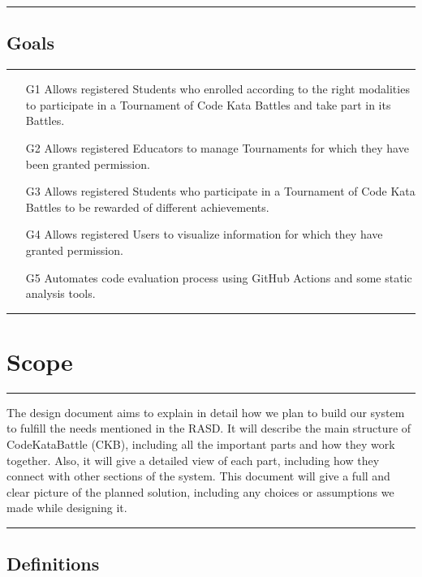 \documentclass{Configuration_Files/Template}
\begin{document}
{\color{bluepoli}\rule{\linewidth}{0.1pt}}

\subsection{Goals}

{\color{bluepoli}\rule{\linewidth}{0.1pt}}

\begin{enumerate}
    \item[\textcolor{bluepoli}{G1}] Allows registered Students who enrolled according to the right modalities to participate in a Tournament of Code Kata Battles and take part in its Battles.
    \item[\textcolor{bluepoli}{G2}] Allows registered Educators to manage Tournaments for which they have been granted permission.
    \item[\textcolor{bluepoli}{G3}] Allows registered Students who participate in a Tournament of Code Kata Battles to be rewarded of different achievements.
    \item[\textcolor{bluepoli}{G4}] Allows registered Users to visualize information for which they have granted permission.
    \item[\textcolor{bluepoli}{G5}] Automates code evaluation process using GitHub Actions and some static analysis tools.
\end{enumerate}

{\color{bluepoli}\rule{\linewidth}{0.1pt}}

\section{Scope}

{\color{bluepoli}\rule{\linewidth}{0.1pt}}

The design document aims to explain in detail how we plan to build our system to fulfill the needs mentioned in the RASD. It will describe the main structure of CodeKataBattle (CKB), including all the important parts and how they work together. Also, it will give a detailed view of each part, including how they connect with other sections of the system. This document will give a full and clear picture of the planned solution, including any choices or assumptions we made while designing it.

{\color{bluepoli}\rule{\linewidth}{0.1pt}}

\subsection{Definitions}
\end{document}
